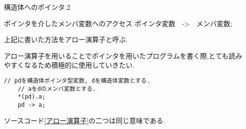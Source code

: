 \documentclass[xdvipdfmx, 8pt, t]{beamer}
\begin{document}
\begin{frame}[fragile]{構造体へのポインタ.2}
\begin{block}{ポインタを介したメンバ変数へのアクセス}
    ポインタ変数　->　メンバ変数;

    上記に書いた方法をアロー演算子と呼ぶ.
\end{block}
アロー演算子を用いることでポインタを用いたプログラムを書く際,とても読みやすくなるため積極的に使用していきたい.

\begin{lstlisting}[caption=アロー演算子, label=アロー演算子]
    // pdを構造体ポインタ型変数, dを構造体変数とする.
    // aをdのメンバ変数とする.
    *(pd).a;
    pd -> a;
\end{lstlisting}
ソースコード\ref{アロー演算子}の二つは同じ意味である.
\end{frame}
\end{document}
